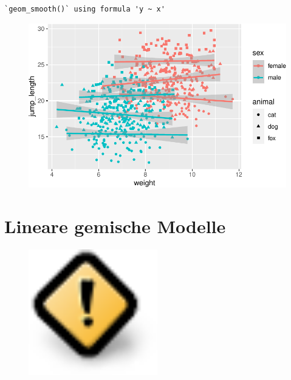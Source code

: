 \documentclass[
  letterpaper,
]{scrbook}
\begin{document}
\begin{verbatim}
`geom_smooth()` using formula 'y ~ x'
\end{verbatim}

\begin{figure}[H]

{\centering \includegraphics{./stat-modeling-gaussian_files/figure-pdf/unnamed-chunk-5-2.pdf}

}

\end{figure}

\hypertarget{sec-mixed}{%
\chapter{Lineare gemische Modelle}\label{sec-mixed}}

\begin{figure}

{\centering \includegraphics[width=0.5\textwidth,height=\textheight]{./images/caution.png}

}

\end{figure}
\end{document}
